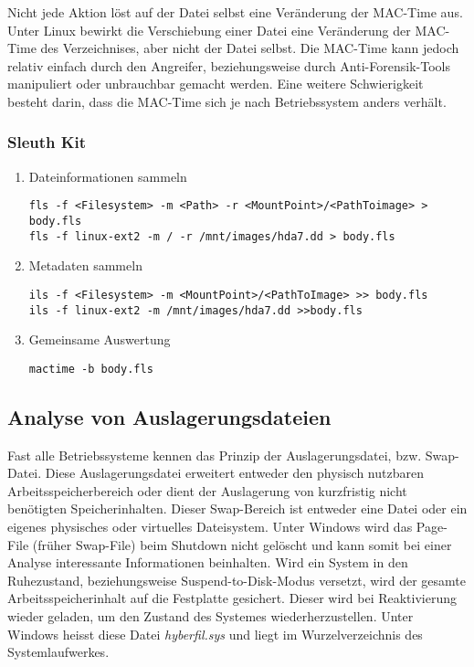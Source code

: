 Nicht jede Aktion löst auf der Datei selbst eine Veränderung der MAC-Time aus. Unter Linux bewirkt die Verschiebung einer Datei eine Veränderung der MAC-Time des Verzeichnises, aber nicht der Datei selbst. Die MAC-Time kann jedoch relativ einfach durch den Angreifer, beziehungsweise durch Anti-Forensik-Tools manipuliert oder unbrauchbar gemacht werden. Eine weitere Schwierigkeit besteht darin, dass die MAC-Time sich je nach Betriebssystem anders verhält.


\subsubsection{Sleuth Kit}
\begin{enumerate}
\item Dateinformationen sammeln
\begin{lstlisting}
fls -f <Filesystem> -m <Path> -r <MountPoint>/<PathToimage> > body.fls
fls -f linux-ext2 -m / -r /mnt/images/hda7.dd > body.fls
\end{lstlisting}

\item Metadaten sammeln
\begin{lstlisting}
ils -f <Filesystem> -m <MountPoint>/<PathToImage> >> body.fls
ils -f linux-ext2 -m /mnt/images/hda7.dd >>body.fls
\end{lstlisting}

\item Gemeinsame Auswertung
\begin{lstlisting}
mactime -b body.fls
\end{lstlisting}
\end{enumerate}



\subsection{Analyse von Auslagerungsdateien}
Fast alle Betriebssysteme kennen das Prinzip der Auslagerungsdatei, bzw. Swap-Datei. Diese Auslagerungsdatei erweitert entweder den physisch nutzbaren Arbeitsspeicherbereich oder dient der Auslagerung von kurzfristig nicht benötigten Speicherinhalten. Dieser Swap-Bereich ist entweder eine Datei oder ein eigenes physisches oder virtuelles Dateisystem. Unter Windows wird das Page-File (früher Swap-File) beim Shutdown nicht gelöscht und kann somit bei einer Analyse interessante Informationen beinhalten. Wird ein System in den Ruhezustand, beziehungsweise Suspend-to-Disk-Modus versetzt, wird der gesamte Arbeitsspeicherinhalt auf die Festplatte gesichert. Dieser wird bei Reaktivierung wieder geladen, um den Zustand des Systemes wiederherzustellen. Unter Windows heisst diese Datei \textit{hyberfil.sys} und liegt im Wurzelverzeichnis des Systemlaufwerkes.

